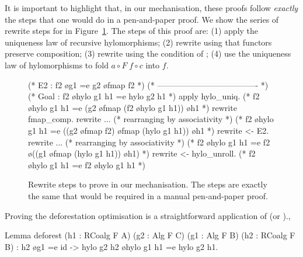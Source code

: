 \documentclass[a4paper,UKenglish,cleveref, autoref, thm-restate]{lipics-v2021}
\begin{document}
\noindent
It is important to highlight that, in our mechanisation, these proofs follow
\emph{exactly} the steps that one would do in a pen-and-paper proof.  We show
the series of rewrite steps for  in
Figure~\ref{fig:proof-fusion-l}. The steps of this proof are: (1) apply the
uniqueness law of recursive hylomorphisms; (2) rewrite using that
functors preserve composition; (3) rewrite using the
condition of ; (4) use the uniqueness law of hylomorphisms to
fold $a \circ F \; f \circ c$ into $f$.
\begin{figure}[t!]
\begin{coqcode}
(* E2 : f2 \o g1 =e g2 \o fmap f2 *)
(* ------------------------------------- *)
(* Goal : f2 \o hylo g1 h1 =e hylo g2 h1 *)
apply hylo_uniq.
       (* f2 \o hylo g1 h1 =e (g2 \o fmap (f2 \o hylo g1 h1)) \o h1        *)
rewrite fmap_comp.
rewrite ... (* rearranging by associativity *)
       (* f2 \o hylo g1 h1 =e ((g2 \o fmap f2) \o fmap (hylo g1 h1)) \o h1 *)
rewrite <- E2.
rewrite ... (* rearranging by associativity *)
       (* f2 \o hylo g1 h1 =e f2 \o ((g1 \o fmap (hylo g1 h1)) \o h1)      *)
rewrite <- hylo_unroll.
       (* f2 \o hylo g1 h1 =e f2 \o hylo g1 h1                             *)
\end{coqcode}

  \vspace{-.5cm}
  \caption{Rewrite steps to prove  in our mechanisation. The
steps are exactly the same that would be required in a manual pen-and-paper
proof.}
\label{fig:proof-fusion-l}
\end{figure}


Proving the deforestation optimisation is a straightforward application
of  (or ).,
\begin{coqcode}
Lemma deforest (h1 : RCoalg F A) (g2 : Alg F C) (g1 : Alg F B) (h2 : RCoalg F B)
  : h2 \o g1 =e id -> hylo g2 h2 \o hylo g1 h1 =e hylo g2 h1.
\end{coqcode}
\end{document}
